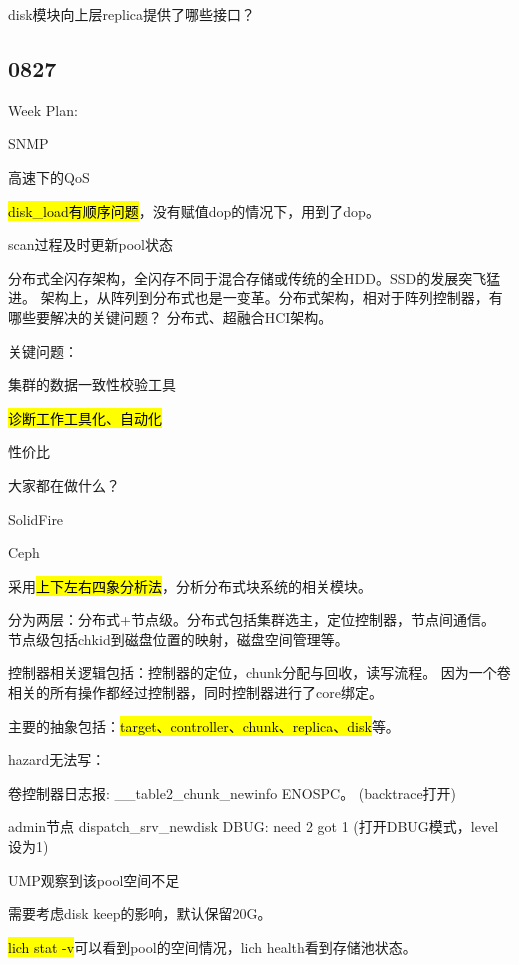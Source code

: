 disk模块向上层replica提供了哪些接口？

\subsection{0827}

Week Plan:
\begin{enumbox}
\item SNMP
\item 高速下的QoS
\item \hl{disk\_load有顺序问题}，没有赋值dop的情况下，用到了dop。
\item scan过程及时更新pool状态
\end{enumbox}

分布式全闪存架构，全闪存不同于混合存储或传统的全HDD。SSD的发展突飞猛进。
架构上，从阵列到分布式也是一变革。分布式架构，相对于阵列控制器，有哪些要解决的关键问题？
分布式、超融合HCI架构。

关键问题：
\begin{enumbox}
\item 集群的数据一致性校验工具
\item \hl{诊断工作工具化、自动化}
\item 性价比
\item 大家都在做什么？
\item SolidFire
\item Ceph
\end{enumbox}

采用\hl{上下左右四象分析法}，分析分布式块系统的相关模块。

分为两层：分布式+节点级。分布式包括集群选主，定位控制器，节点间通信。
节点级包括chkid到磁盘位置的映射，磁盘空间管理等。

控制器相关逻辑包括：控制器的定位，chunk分配与回收，读写流程。
因为一个卷相关的所有操作都经过控制器，同时控制器进行了core绑定。

主要的抽象包括：\hl{target、controller、chunk、replica、disk}等。

hazard无法写：
\begin{enumbox}
\item 卷控制器日志报: \_\_table2\_chunk\_newinfo ENOSPC。 (backtrace打开)
\item admin节点 dispatch\_srv\_newdisk DBUG: need 2 got 1 (打开DBUG模式，level设为1)
\item UMP观察到该pool空间不足
\item 需要考虑disk keep的影响，默认保留20G。
\end{enumbox}

\hl{lich stat -v}可以看到pool的空间情况，lich health看到存储池状态。

